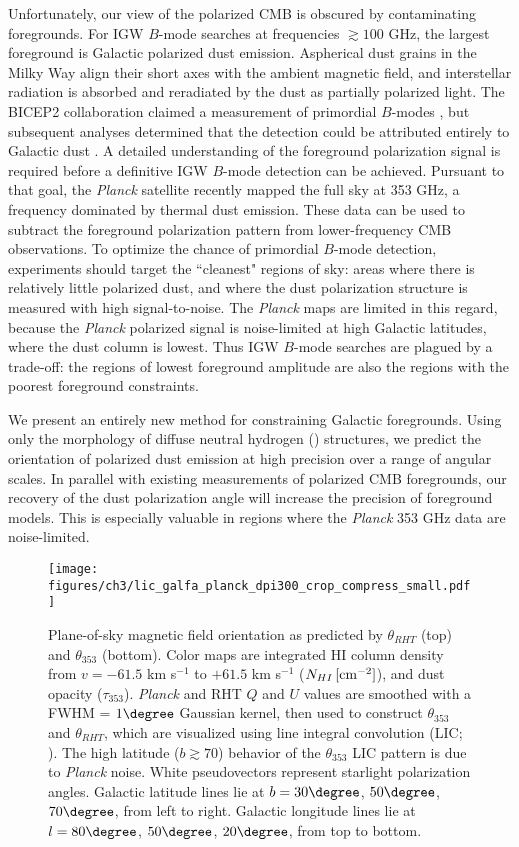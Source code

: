 Unfortunately, our view of the polarized CMB is obscured by contaminating foregrounds. For IGW $B$-mode searches at frequencies $\gtrsim 100$ GHz, the largest foreground is Galactic polarized dust emission. Aspherical dust grains in the Milky Way align their short axes with the ambient magnetic field, and interstellar radiation is absorbed and reradiated by the dust as partially polarized light. The BICEP2 collaboration claimed a measurement of primordial $B$-modes \cite{Ade:2014dj}, but subsequent analyses determined that the detection could be attributed entirely to Galactic dust \cite{Flauger:2014ub,Collaborations:2015wh}. A detailed understanding of the foreground polarization signal is required before a definitive IGW $B$-mode detection can be achieved. Pursuant to that goal, the \textit{Planck} satellite recently mapped the full sky at 353 GHz, a frequency dominated by thermal dust emission. These data can be used to subtract the foreground polarization pattern from lower-frequency CMB observations. To optimize the chance of primordial $B$-mode detection, experiments should target the ``cleanest" regions of sky: areas where there is relatively little polarized dust, and where the dust polarization structure is measured with high signal-to-noise. The \textit{Planck} maps are limited in this regard, because the \textit{Planck} polarized signal is noise-limited at high Galactic latitudes, where the dust column is lowest. Thus IGW $B$-mode searches are plagued by a trade-off: the regions of lowest foreground amplitude are also the regions with the poorest foreground constraints.

We present an entirely new method for constraining Galactic foregrounds. Using only the morphology of diffuse neutral hydrogen (\HI) structures, we predict the orientation of polarized dust emission at high precision over a range of angular scales. In parallel with existing measurements of polarized CMB foregrounds, our recovery of the dust polarization angle will increase the precision of foreground models. This is especially valuable in regions where the \textit{Planck} 353 GHz data are noise-limited.

\begin{figure*}
\centering
\texttt{[image: figures/ch3/lic\_galfa\_planck\_dpi300\_crop\_compress\_small.pdf]}
\caption{Plane-of-sky magnetic field orientation as predicted by $\theta_{RHT}$ (top) and $\theta_{353}$ (bottom). Color maps are integrated HI column density from $v = -61.5$ km s$^{-1}$ to $+61.5$ km s$^{-1}$ ($N_{HI} \,[{\rm cm}^{-2}]$), and dust opacity ($\tau_{353}$). \textit{Planck} and RHT $Q$ and $U$ values are smoothed with a FWHM = $1\degree$ Gaussian kernel, then used to construct $\theta_{353}$ and $\theta_{RHT}$, which are visualized using line integral convolution (LIC; \cite{Cabral:1993}). The high latitude ($b \gtrsim 70$) behavior of the $\theta_{353}$ LIC pattern is due to \textit{Planck} noise. White pseudovectors represent starlight polarization angles. Galactic latitude lines lie at $b = 30\degree$, $50\degree$, $70\degree$, from left to right. Galactic longitude lines lie at $l = 80\degree$, $50\degree$, $20\degree$, from top to bottom. \label{colormaps}}
\end{figure*}


